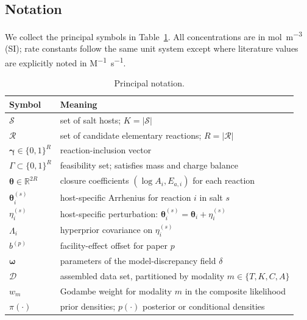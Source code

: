 \documentclass[12pt]{article}
\theoremstyle{plain}
\theoremstyle{definition}
\theoremstyle{remark}
\newcommand{\R}{\mathbb{R}}
\begin{document}
\subsection{Notation}\label{sec:framework:notation}

We collect the principal symbols in Table~\ref{tab:notation}.  All
concentrations are in \si{mol\per m^3} (SI); rate constants follow the same
unit system except where literature values are explicitly noted in
\si{M^{-1}.s^{-1}}.

\begin{table}[ht]\centering
\caption{Principal notation.}\label{tab:notation}
\small
\begin{tabular}{lp{}}
\toprule
Symbol & Meaning \\
\midrule
$\mathcal{S}$ & set of salt hosts; $K = |\mathcal{S}|$ \\
$\mathcal{R}$ & set of candidate elementary reactions; $R = |\mathcal{R}|$ \\
$\boldsymbol\gamma \in \{0,1\}^R$ & reaction-inclusion vector \\
$\Gamma \subset \{0,1\}^R$ & feasibility set; satisfies mass and charge balance \\
$\boldsymbol\theta \in \R^{2R}$ & closure coefficients $(\log A_i, E_{a,i})$ for each reaction \\
$\boldsymbol\theta_i^{(s)}$ & host-specific Arrhenius for reaction $i$ in salt $s$ \\
$\eta_i^{(s)}$ & host-specific perturbation: $\boldsymbol\theta_i^{(s)} = \boldsymbol\theta_i + \eta_i^{(s)}$ \\
$\Lambda_i$ & hyperprior covariance on $\eta_i^{(s)}$ \\
$b^{(p)}$ & facility-effect offset for paper $p$ \\
$\boldsymbol\omega$ & parameters of the model-discrepancy field $\delta$ \\
$\mathcal{D}$ & assembled data set, partitioned by modality $m\in\{T,K,C,A\}$ \\
$w_m$ & Godambe weight for modality $m$ in the composite likelihood \\
$\pi(\cdot)$ & prior densities; $p(\cdot)$ posterior or conditional densities \\
\bottomrule
\end{tabular}
\end{table}
\end{document}
